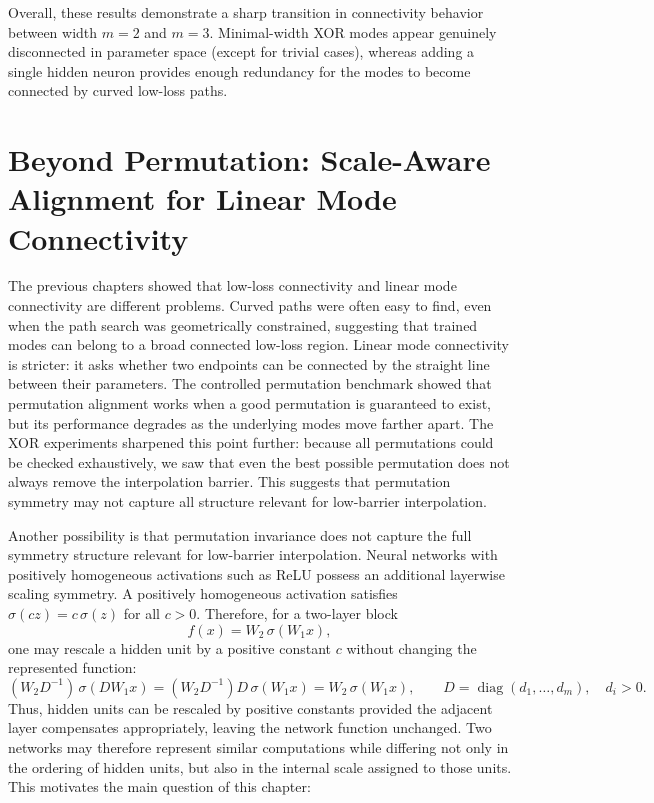 \documentclass[11pt,a4paper]{report}
\begin{document}
Overall, these results demonstrate a sharp transition in connectivity behavior between width $m=2$ and $m=3$. Minimal-width XOR modes appear genuinely disconnected in parameter space (except for trivial cases), whereas adding a single hidden neuron provides enough redundancy for the modes to become connected by curved low-loss paths.


\chapter{Beyond Permutation: Scale-Aware Alignment for Linear Mode Connectivity}
\label{chap:scale_aware_alignment}
\label{chap:symmetry-aware}

The previous chapters showed that low-loss connectivity and linear mode connectivity are different problems. Curved paths were often easy to find, even when the path search was geometrically constrained, suggesting that trained modes can belong to a broad connected low-loss region. Linear mode connectivity is stricter: it asks whether two endpoints can be connected by the straight line between their parameters. The controlled permutation benchmark showed that permutation alignment works when a good permutation is guaranteed to exist, but its performance degrades as the underlying modes move farther apart. The XOR experiments sharpened this point further: because all permutations could be checked exhaustively, we saw that even the best possible permutation does not always remove the interpolation barrier. This suggests that permutation symmetry may not capture all structure relevant for low-barrier interpolation. 

Another possibility is that permutation invariance does not capture the full symmetry structure relevant for low-barrier interpolation. Neural networks with positively homogeneous activations such as ReLU possess an additional layerwise scaling symmetry. A positively homogeneous activation satisfies \(\sigma(cz)=c\,\sigma(z)\) for all \(c>0\). Therefore, for a two-layer block
\[
f(x)=W_2\,\sigma(W_1x),
\]
one may rescale a hidden unit by a positive constant \(c\) without changing the represented function:
\[
(W_2D^{-1})\,\sigma(DW_1x)
=(W_2D^{-1})D\,\sigma(W_1x)
=W_2\,\sigma(W_1x), \qquad
D=\operatorname{diag}(d_1,\dots,d_m),\quad d_i>0.
\]
Thus, hidden units can be rescaled by positive constants provided the adjacent layer compensates appropriately, leaving the network function unchanged. Two networks may therefore represent similar computations while differing not only in the ordering of hidden units, but also in the internal scale assigned to those units. This motivates the main question of this chapter:
\end{document}
